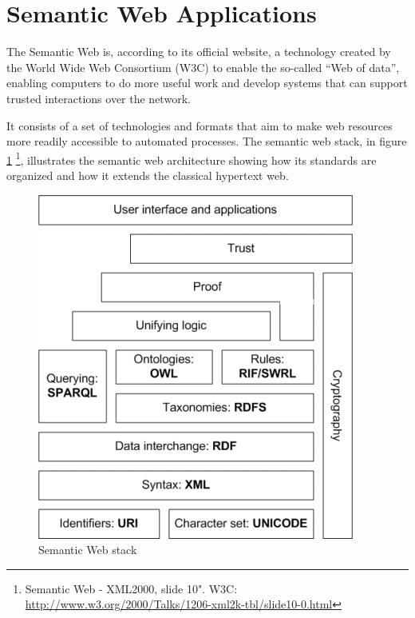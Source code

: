 \cite{DBLP:conf/sac/CaldersGPR09}
\cite{Vinh:2010:ITM:1953011.1953024}


\section{Semantic Web Applications}

The Semantic Web is, according to its official website, a technology created by the World Wide Web Consortium (W3C) to
enable the so-called ``Web of data'', enabling computers to do more useful work and develop systems that can support
trusted interactions over the network. 

It consists of a set of technologies and formats that aim to make web resources more readily accessible to automated
processes. The semantic web stack, in figure \ref{fig:sematicWebLayer} \footnote{Semantic Web - XML2000, slide 10".
W3C: \url{http://www.w3.org/2000/Talks/1206-xml2k-tbl/slide10-0.html}}, illustrates the semantic web architecture
showing how its standards are organized and how it extends the classical hypertext web.

\begin{figure}
\label{fig:sematicWebLayer}
\begin{center}
  \includegraphics[width=0.5\linewidth]{./Figures/Semantic-web-stack.png}
\end{center}
\caption{Semantic Web stack}
\end{figure}

